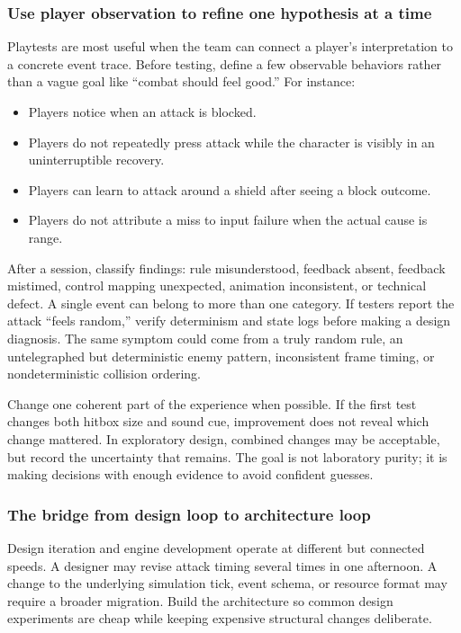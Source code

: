 \subsubsection{Use player observation to refine one hypothesis at a time}\label{use-player-observation-to-refine-one-hypothesis-at-a-time}

Playtests are most useful when the team can connect a player's interpretation to a concrete event trace. Before testing, define a few observable behaviors rather than a vague goal like ``combat should feel good.'' For instance:

\begin{itemize}
\tightlist
\item
  Players notice when an attack is blocked.
\item
  Players do not repeatedly press attack while the character is visibly in an uninterruptible recovery.
\item
  Players can learn to attack around a shield after seeing a block outcome.
\item
  Players do not attribute a miss to input failure when the actual cause is range.
\end{itemize}

After a session, classify findings: rule misunderstood, feedback absent, feedback mistimed, control mapping unexpected, animation inconsistent, or technical defect. A single event can belong to more than one category. If testers report the attack ``feels random,'' verify determinism and state logs before making a design diagnosis. The same symptom could come from a truly random rule, an untelegraphed but deterministic enemy pattern, inconsistent frame timing, or nondeterministic collision ordering.

Change one coherent part of the experience when possible. If the first test changes both hitbox size and sound cue, improvement does not reveal which change mattered. In exploratory design, combined changes may be acceptable, but record the uncertainty that remains. The goal is not laboratory purity; it is making decisions with enough evidence to avoid confident guesses.

\subsubsection{The bridge from design loop to architecture loop}\label{the-bridge-from-design-loop-to-architecture-loop}

Design iteration and engine development operate at different but connected speeds. A designer may revise attack timing several times in one afternoon. A change to the underlying simulation tick, event schema, or resource format may require a broader migration. Build the architecture so common design experiments are cheap while keeping expensive structural changes deliberate.

